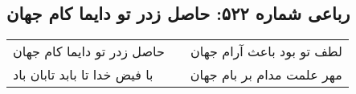 \begin{center}
\section*{رباعی شماره ۵۲۲: حاصل زدر تو دایما کام جهان}
\label{sec:sh522}
\begin{longtable}{l p{0.5cm} r}
حاصل زدر تو دایما کام جهان
&&
لطف تو بود باعث آرام جهان
\\
با فیض خدا تا بابد تابان باد
&&
مهر علمت مدام بر بام جهان
\\
\end{longtable}
\end{center}
